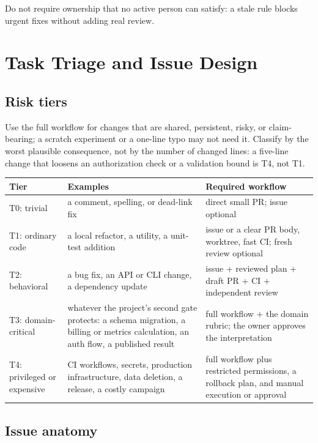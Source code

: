 \documentclass[11pt]{article}
\begin{document}
Do not require ownership that no active person can satisfy: a stale rule blocks urgent fixes
without adding real review.

\section{Task Triage and Issue Design}

\subsection{Risk tiers}

Use the full workflow for changes that are shared, persistent, risky, or claim-bearing; a scratch
experiment or a one-line typo may not need it. Classify by the worst plausible consequence, not
by the number of changed lines: a five-line change that loosens an authorization check or a
validation bound is T4, not T1.

\begin{center}
\begin{tabularx}{\textwidth}{@{}l Y Y@{}}
\toprule
\textbf{Tier} & \textbf{Examples} & \textbf{Required workflow} \\
\midrule
T0: trivial & a comment, spelling, or dead-link fix & direct small PR; issue optional \\
T1: ordinary code & a local refactor, a utility, a unit-test addition & issue or a clear PR
  body, worktree, fast CI; fresh review optional \\
T2: behavioral & a bug fix, an API or CLI change, a dependency update & issue + reviewed plan +
  draft PR + CI + independent review \\
T3: domain-critical & whatever the project's second gate protects: a schema migration, a billing
  or metrics calculation, an auth flow, a published result & full workflow + the domain rubric;
  the owner approves the interpretation \\
T4: privileged or expensive & CI workflows, secrets, production infrastructure, data deletion, a
  release, a costly campaign & full workflow plus restricted permissions, a rollback plan, and
  manual execution or approval \\
\bottomrule
\end{tabularx}
\end{center}

\subsection{Issue anatomy}
\end{document}
